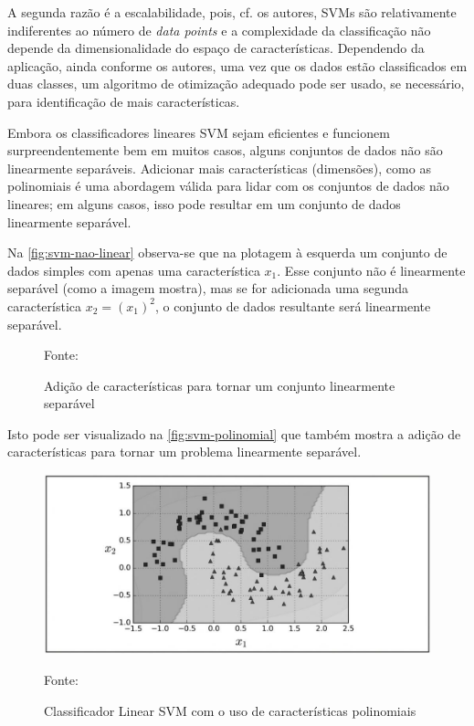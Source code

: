 A segunda razão é a escalabilidade, pois, cf. os autores, SVMs são relativamente indiferentes ao número de \textit{data points} e a complexidade da classificação não depende da dimensionalidade do espaço de características. Dependendo da aplicação, ainda conforme os autores, uma vez que os dados estão classificados em duas classes, um algoritmo de otimização adequado pode ser usado, se necessário,  para identificação de mais características.

Embora os classificadores lineares SVM sejam eficientes e funcionem surpreendentemente bem em muitos casos, alguns conjuntos de dados não são linearmente separáveis. Adicionar mais características (dimensões), como as polinomiais é uma abordagem válida para lidar com os conjuntos de dados não lineares; em alguns casos, isso pode resultar em um conjunto de dados linearmente separável. \cite[p. 153]{geron_maos_2020}

Na \autoref{fig:svm-nao-linear} observa-se que na plotagem à esquerda um conjunto de dados simples com apenas uma característica $ x_1$. Esse conjunto não é linearmente separável (como a imagem mostra), mas se for adicionada uma segunda característica $ x_2 = (x_1)^2 $, o conjunto de dados resultante será linearmente separável.

\begin{figure}[h!]
	\centering
	\caption{Adição de características para tornar um conjunto linearmente separável}
	
	\label{fig:svm-nao-linear}
	{\scriptsize 	Fonte: }
\end{figure}

Isto pode ser visualizado na \autoref{fig:svm-polinomial} que também mostra a adição de características para tornar um problema linearmente separável.
\begin{figure}[h!]
	\centering
	\caption{Classificador Linear SVM com o uso de características polinomiais}
	\includegraphics[width=.8\textwidth]{imagens/svm-polinomial.png}
		
	\label{fig:svm-polinomial}
	{\scriptsize 	Fonte: }
\end{figure}

